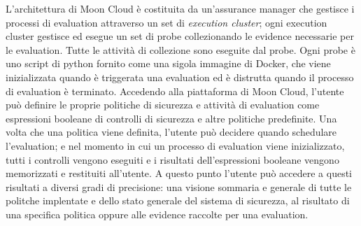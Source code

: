 L'architettura di Moon Cloud è costituita da un'assurance manager che gestisce i processi di evaluation attraverso un 
set di \textit{execution cluster}; ogni execution cluster gestisce ed esegue un set di probe collezionando le 
evidence necessarie per le evaluation. Tutte le attività di collezione sono eseguite dal probe. Ogni probe è 
uno script di python fornito come una sigola immagine di Docker, che viene inizializzata quando è triggerata una 
evaluation ed è distrutta quando il processo di evaluation è terminato.
\newline
Accedendo alla piattaforma di Moon Cloud, l'utente può definire le proprie politiche di sicurezza e attività di 
evaluation come espressioni booleane di controlli di sicurezza e altre politiche predefinite. Una volta che una 
politica viene definita, l'utente può decidere quando schedulare l'evaluation; e nel momento in cui un
processo di evaluation viene inizializzato, tutti i controlli vengono eseguiti e i risultati dell'espressioni 
booleane vengono memorizzati e restituiti all'utente. A questo punto l'utente può accedere a questi risultati a 
diversi gradi di precisione: una visione sommaria e generale di tutte le politche implentate e dello stato 
generale del sistema di sicurezza, al risultato di una specifica politica oppure alle evidence raccolte per una 
evaluation.